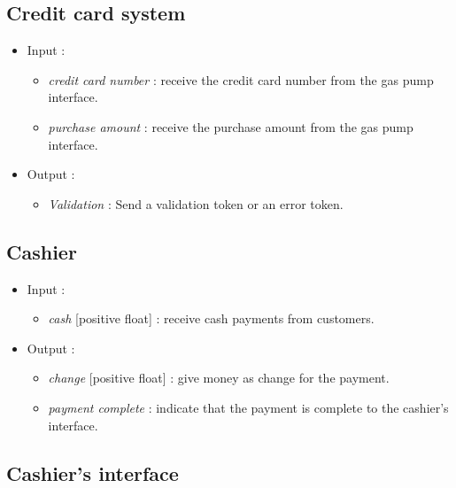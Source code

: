 \documentclass[11pt, a4paper]{article}
\newcommand{\data}[1]{\textit{#1}}
\begin{document}
\bigskip

\subsection{Credit card system}

\begin{itemize}
\item Input :
		\begin{itemize}
		\item \data{credit card number} : receive the credit card number from the gas pump interface.
		\item \data{purchase amount} : receive the purchase amount from the gas pump interface.
		\end{itemize}
\item Output :
    \begin{itemize}
    \item \data{Validation} : Send a validation token or an error token.
    \end{itemize}

\end{itemize}


\bigskip

\subsection{Cashier}

\begin{itemize}
\item Input :
		\begin{itemize}
		\item \data{cash} [positive float] : receive cash payments from customers.
		\end{itemize}

\item Output :
		\begin{itemize}
		\item \data{change} [positive float] : give money as change for the payment.
		\item \data{payment complete} : indicate that the payment is complete to the cashier's interface.
		\end{itemize}
\end{itemize}



\newpage
\subsection{Cashier's interface}
\end{document}
